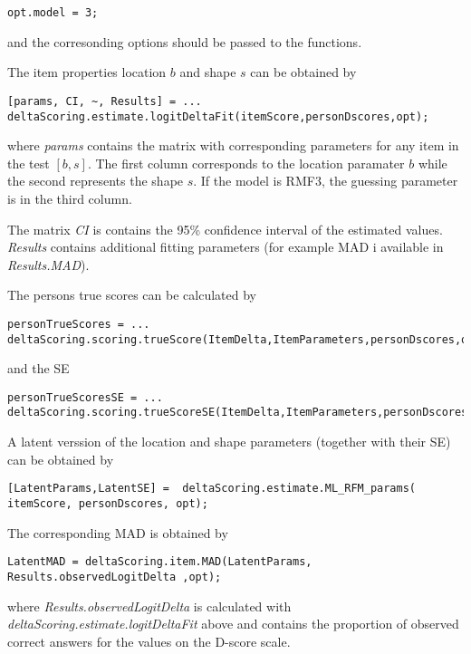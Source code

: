 \documentclass[12pt]{article}
\begin{document}
\begin{lstlisting}[style=Matlab-bw]
opt.model = 3;
\end{lstlisting}

and the corresonding options should be passed to the functions.

The item properties location $b$ and shape $s$ can be obtained by

\begin{lstlisting}[style=Matlab-bw]
[params, CI, ~, Results] = ...
deltaScoring.estimate.logitDeltaFit(itemScore,personDscores,opt);
\end{lstlisting}

where {\itshape params} contains the matrix with corresponding parameters for any item in the test $[b,s]$. The first column corresponds to the location paramater  $b$ while the second represents the shape $s$. If the model is RMF3, the guessing parameter is in the third column.

The matrix {\itshape CI} is contains the 95\% confidence interval of the estimated values. {\itshape Results} contains additional fitting parameters (for example MAD i available in {\itshape Results.MAD}).

The persons true scores can be calculated by
\begin{lstlisting}[style=Matlab-bw]
personTrueScores = ...
deltaScoring.scoring.trueScore(ItemDelta,ItemParameters,personDscores,opt);
\end{lstlisting}

and the SE 

\begin{lstlisting}[style=Matlab-bw]
personTrueScoresSE = ...
deltaScoring.scoring.trueScoreSE(ItemDelta,ItemParameters,personDscores,opt);
\end{lstlisting}


A latent verssion of the location and shape parameters (together with their SE) can be obtained by 
\begin{lstlisting}[style=Matlab-bw]
[LatentParams,LatentSE] =  deltaScoring.estimate.ML_RFM_params( itemScore, personDscores, opt);
\end{lstlisting}

The corresponding MAD is obtained by
\begin{lstlisting}[style=Matlab-bw]
LatentMAD = deltaScoring.item.MAD(LatentParams, Results.observedLogitDelta ,opt);
\end{lstlisting}

where {\itshape Results.observedLogitDelta} is calculated with {\itshape deltaScoring.estimate.logitDeltaFit} above and contains the proportion of observed correct answers for the values on the D-score scale.
\end{document}
